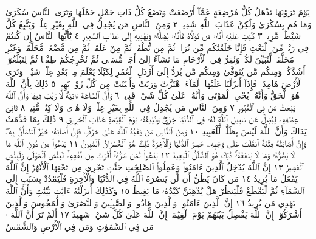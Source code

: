 يَوْمَ تَرَوْنَهَا تَذْهَلُ كُلُّ مُرْضِعَةٍ عَمَّآ أَرْضَعَتْ وَتَضَعُ كُلُّ
ذَاتِ حَمْلٍ حَمْلَهَا وَتَرَى ٱلنَّاسَ سُكَٰرَىٰ وَمَا هُم بِسُكَٰرَىٰ
وَلَٰكِنَّ عَذَابَ ٱللَّهِ شَدِيدࣱ ٢ وَمِنَ ٱلنَّاسِ مَن يُجَٰدِلُ فِي ٱللَّهِ
بِغَيْرِ عِلْمࣲ وَيَتَّبِعُ كُلَّ شَيْطَٰنࣲ مَّرِيدࣲ ٣ كُتِبَ عَلَيْهِ أَنَّهُۥ
مَن تَوَلَّاهُ فَأَنَّهُۥ يُضِلُّهُۥ وَيَهْدِيهِ إِلَىٰ عَذَابِ ٱلسَّعِيرِ ٤
يَٰٓأَيُّهَا ٱلنَّاسُ إِن كُنتُمْ فِي رَيْبࣲ مِّنَ ٱلْبَعْثِ فَإِنَّا خَلَقْنَٰكُم
مِّن تُرَابࣲ ثُمَّ مِن نُّطْفَةࣲ ثُمَّ مِنْ عَلَقَةࣲ ثُمَّ مِن مُّضْغَةࣲ
مُّخَلَّقَةࣲ وَغَيْرِ مُخَلَّقَةࣲ لِّنُبَيِّنَ لَكُمْۚ وَنُقِرُّ فِي ٱلْأَرْحَامِ مَا نَشَآءُ
إِلَىٰٓ أَجَلࣲ مُّسَمࣰّى ثُمَّ نُخْرِجُكُمْ طِفْلࣰا ثُمَّ لِتَبْلُغُوٓا۟ أَشُدَّكُمْۖ
وَمِنكُم مَّن يُتَوَفَّىٰ وَمِنكُم مَّن يُرَدُّ إِلَىٰٓ أَرْذَلِ ٱلْعُمُرِ لِكَيْلَا
يَعْلَمَ مِنۢ بَعْدِ عِلْمࣲ شَيْـࣰٔاۚ وَتَرَى ٱلْأَرْضَ هَامِدَةࣰ فَإِذَآ أَنزَلْنَا عَلَيْهَا
ٱلْمَآءَ ٱهْتَزَّتْ وَرَبَتْ وَأَنۢبَتَتْ مِن كُلِّ زَوْجِۭ بَهِيجࣲ ٥
ذَٰلِكَ بِأَنَّ ٱللَّهَ هُوَ ٱلْحَقُّ وَأَنَّهُۥ يُحْيِ ٱلْمَوْتَىٰ وَأَنَّهُۥ عَلَىٰ كُلِّ شَيْءࣲ
قَدِيرࣱ ٦ وَأَنَّ ٱلسَّاعَةَ ءَاتِيَةࣱ لَّا رَيْبَ فِيهَا وَأَنَّ ٱللَّهَ يَبْعَثُ مَن فِي
ٱلْقُبُورِ ٧ وَمِنَ ٱلنَّاسِ مَن يُجَٰدِلُ فِي ٱللَّهِ بِغَيْرِ عِلْمࣲ وَلَا هُدࣰى
وَلَا كِتَٰبࣲ مُّنِيرࣲ ٨ ثَانِيَ عِطْفِهِۦ لِيُضِلَّ عَن سَبِيلِ ٱللَّهِۖ لَهُۥ فِي
ٱلدُّنْيَا خِزْيࣱۖ وَنُذِيقُهُۥ يَوْمَ ٱلْقِيَٰمَةِ عَذَابَ ٱلْحَرِيقِ ٩ ذَٰلِكَ
بِمَا قَدَّمَتْ يَدَاكَ وَأَنَّ ٱللَّهَ لَيْسَ بِظَلَّٰمࣲ لِّلْعَبِيدِ ١٠ وَمِنَ ٱلنَّاسِ
مَن يَعْبُدُ ٱللَّهَ عَلَىٰ حَرْفࣲۖ فَإِنْ أَصَابَهُۥ خَيْرٌ ٱطْمَأَنَّ بِهِۦۖ وَإِنْ
أَصَابَتْهُ فِتْنَةٌ ٱنقَلَبَ عَلَىٰ وَجْهِهِۦ خَسِرَ ٱلدُّنْيَا وَٱلْأٓخِرَةَۚ ذَٰلِكَ
هُوَ ٱلْخُسْرَانُ ٱلْمُبِينُ ١١ يَدْعُوا۟ مِن دُونِ ٱللَّهِ مَا لَا يَضُرُّهُۥ
وَمَا لَا يَنفَعُهُۥۚ ذَٰلِكَ هُوَ ٱلضَّلَٰلُ ٱلْبَعِيدُ ١٢ يَدْعُوا۟ لَمَن
ضَرُّهُۥٓ أَقْرَبُ مِن نَّفْعِهِۦۚ لَبِئْسَ ٱلْمَوْلَىٰ وَلَبِئْسَ ٱلْعَشِيرُ ١٣
إِنَّ ٱللَّهَ يُدْخِلُ ٱلَّذِينَ ءَامَنُوا۟ وَعَمِلُوا۟ ٱلصَّٰلِحَٰتِ جَنَّٰتࣲ
تَجْرِي مِن تَحْتِهَا ٱلْأَنْهَٰرُۚ إِنَّ ٱللَّهَ يَفْعَلُ مَا يُرِيدُ ١٤ مَن كَانَ
يَظُنُّ أَن لَّن يَنصُرَهُ ٱللَّهُ فِي ٱلدُّنْيَا وَٱلْأٓخِرَةِ فَلْيَمْدُدْ بِسَبَبٍ إِلَى
ٱلسَّمَآءِ ثُمَّ لْيَقْطَعْ فَلْيَنظُرْ هَلْ يُذْهِبَنَّ كَيْدُهُۥ مَا يَغِيظُ ١٥
وَكَذَٰلِكَ أَنزَلْنَٰهُ ءَايَٰتِۭ بَيِّنَٰتࣲ وَأَنَّ ٱللَّهَ يَهْدِي مَن يُرِيدُ ١٦
إِنَّ ٱلَّذِينَ ءَامَنُوا۟ وَٱلَّذِينَ هَادُوا۟ وَٱلصَّٰبِـِٔينَ وَٱلنَّصَٰرَىٰ
وَٱلْمَجُوسَ وَٱلَّذِينَ أَشْرَكُوٓا۟ إِنَّ ٱللَّهَ يَفْصِلُ بَيْنَهُمْ يَوْمَ
ٱلْقِيَٰمَةِۚ إِنَّ ٱللَّهَ عَلَىٰ كُلِّ شَيْءࣲ شَهِيدٌ ١٧ أَلَمْ تَرَ أَنَّ ٱللَّهَ
ۥ مَن فِي ٱلسَّمَٰوَٰتِ وَمَن فِي ٱلْأَرْضِ وَٱلشَّمْسُ
